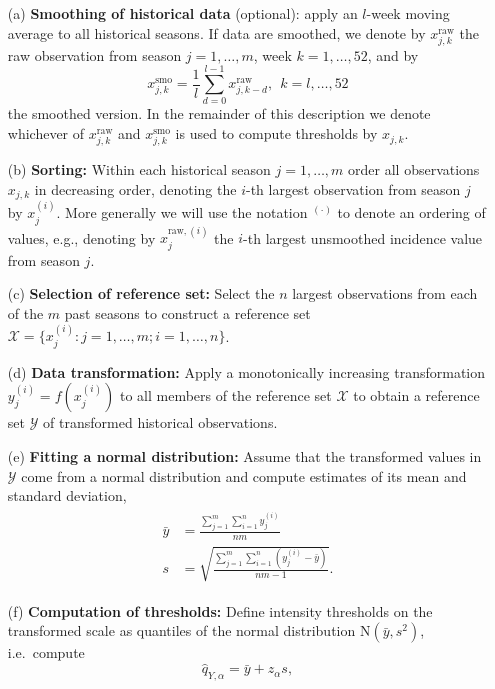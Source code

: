 \documentclass{article}
\newcommand{\sd}{s}
\begin{document}
\begin{enumerate}
\item[(a)] \textbf{Smoothing of historical data} (optional): apply an $l$-week moving average to all historical seasons. If data are smoothed, we denote by $x^\text{raw}_{j, k}$ the raw observation from season $j = 1, \dots, m$, week $k = 1, \dots, 52$, and by
$$
x^\text{smo}_{j, k} = \frac{1}{l} \sum_{d = 0}^{l - 1} x^\text{raw}_{j, k - d}, \ \ k = l, \dots, 52
$$ the smoothed version. In the remainder of this description we denote whichever of $x^\text{raw}_{j, k}$ and $x^\text{smo}_{j, k}$ is used to compute thresholds by $x_{j, k}$.
\item[(b)] \textbf{Sorting:} Within each historical season $j = 1, \dots, m$ order all observations $x_{j, k}$ in decreasing order, denoting the $i$-th largest observation from season $j$ by $x^{(i)}_j$. More generally we will use the notation $^{(\cdot)}$ to denote an ordering of values, e.g., denoting by $x^{\text{raw}, (i)}_j$ the $i$-th largest unsmoothed incidence value from season $j$.
\item[(c)] \textbf{Selection of reference set:} Select the $n$ largest observations from each of the $m$ past seasons to construct a reference set $\mathcal{X} = \{x_j^{(i)}: j = 1, \dots, m; i = 1, \dots, n\}$.
\item[(d)] \textbf{Data transformation:} Apply a monotonically increasing transformation $y_j^{(i)} = f(x_j^{(i)})$ to all members of the reference set $\mathcal{X}$ to obtain a reference set $\mathcal{Y}$ of transformed historical observations.
\item[(e)] \textbf{Fitting a normal distribution:} Assume that the transformed values in $\mathcal{Y}$ come from a normal distribution and compute estimates of its mean and standard deviation,
\begin{align}
\begin{split}
\bar{y} & = \frac{\sum_{j = 1}^m\sum_{i = 1}^n y_j^{(i)}}{nm}\\
\sd & = \sqrt{ \frac{\sum_{j = 1}^m\sum_{i = 1}^n (y_j^{(i)}  - \bar{y})}{nm - 1}}.
\end{split}\label{eq:moments}
\end{align}
\item[(f)] \textbf{Computation of thresholds:} Define intensity thresholds on the transformed scale as quantiles of the normal distribution N$(\bar{y}, \sd^2)$, i.e.\ compute
\begin{equation}
\hat{q}_{Y, \alpha} = \bar{y} + z_\alpha \sd, \label{eq:def_q}

\end{equation}
\end{enumerate}
\end{document}
